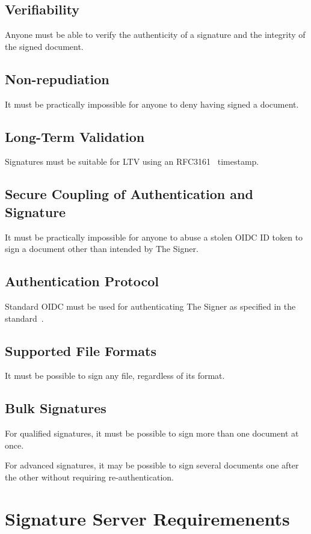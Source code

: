\subsection{Verifiability}
Anyone must be able to verify the authenticity of a signature and the integrity of the signed document.

\subsection{Non-repudiation}
It must be practically impossible for anyone to deny having signed a document.

\subsection{Long-Term Validation}
Signatures must be suitable for \gls{LTV} using an RFC3161~\cite{rfc3161} timestamp.

\subsection{Secure Coupling of Authentication and Signature}
It must be practically impossible for anyone to abuse a stolen \gls{OIDC} ID token to sign a document other than intended by The Signer.

\subsection{Authentication Protocol}
Standard \gls{OIDC} must be used for authenticating The Signer as specified in the standard~\cite{oidc}.

\subsection{Supported File Formats}
It must be possible to sign any file, regardless of its format.

\subsection{Bulk Signatures}
For qualified signatures, it must be possible to sign more than one document at once.

For advanced signatures, it may be possible to sign several documents one after the other without requiring re-authentication.

\section{Signature Server Requiremenents}
\label{sec:signatureserverrequirements}
